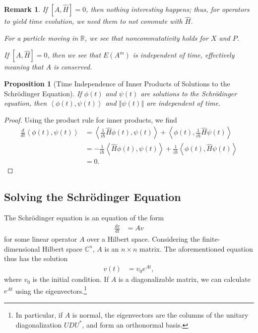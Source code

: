 \documentclass[10pt]{extarticle}
\newtheorem*{remark}{Remark}
\newcommand{\R}{\mathbb{R}}
\newcommand{\C}{\mathbb{C}}
\newcommand{\iprod}[2]{\left\langle #1,#2\right\rangle}
\newcommand{\norm}[1]{\left\Vert #1\right\Vert}
\theoremstyle{plain}
\newtheorem*{proposition}{Proposition}%
\theoremstyle{definition}
\theoremstyle{remark}
\renewcommand{\newline}{\hfill\break}
\begin{document}
  \begin{remark}
    If $[A,\hat{H}] = 0$, then nothing interesting happens; thus, for operators to yield time evolution, we need them to \textit{not} commute with $\hat{H}$.\newline

    For a particle moving in $\R$, we see that noncommutativity holds for $X$ and $P$.\newline

    If $[A,\hat{H}] = 0$, then we see that $E(A^{m})$ is independent of time, effectively meaning that $A$ is conserved.
  \end{remark}
  \begin{proposition}[Time Independence of Inner Products of Solutions to the Schrödinger Equation]
    If $\phi(t)$ and $\psi(t)$ are solutions to the Schrödinger equation, then $\iprod{\phi(t)}{\psi(t)}$ and $\norm{\psi(t)}$ are independent of time.
  \end{proposition}
  \begin{proof}
    Using the product rule for inner products, we find
    \begin{align*}
      \frac{d}{dt}\iprod{\phi(t)}{\psi(t)} &= \iprod{\frac{1}{i\hbar}\hat{H}\phi(t)}{\psi(t)} + \iprod{\phi(t)}{\frac{1}{i\hbar}\hat{H}\psi(t)}\\
                                           &= -\frac{1}{i\hbar}\iprod{\hat{H}\phi(t)}{\psi(t)} + \frac{1}{i\hbar}\iprod{\phi(t)}{\hat{H}\psi(t)}\\
                                           &= 0.
    \end{align*}
  \end{proof}
  \subsection{Solving the Schrödinger Equation}%
  The Schrödinger equation is an equation of the form
  \begin{align*}
    \frac{dv}{dt} &= Av
  \end{align*}
  for some linear operator $A$ over a Hilbert space. Considering the finite-dimensional Hilbert space $\C^{n}$, $A$ is an $n\times n$ matrix. The aforementioned equation thus has the solution
  \begin{align*}
    v(t) &= v_0e^{At},
  \end{align*}
  where $v_0$ is the initial condition. If $A$ is a diagonalizable matrix, we can calculate $e^{At}$ using the eigenvectors.\footnote{In particular, if $A$ is normal, the eigenvectors are the columns of the unitary diagonalization $UDU^{\ast}$, and form an orthonormal basis.}\newline
\end{document}
